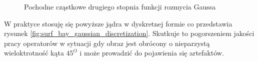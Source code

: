 \begin{figure}
\centering
{}
\caption{Pochodne cząstkowe drugiego stopnia funkcji rozmycia Gaussa}
\label{pict:surf_exact_kernel}
\end{figure}
W praktyce stosuję się powyższe jądra w dyskretnej formie co przedstawia rysunek \ref{fig:surf_bay_gaussian_discretization}. Skutkuje to pogorszeniem jakości pracy operatorów w sytuacji gdy obraz jest obrócony o nieparzystą wieloktrotność kąta $45^O$ i może prowadzić do pojawienia się artefaktów. 

